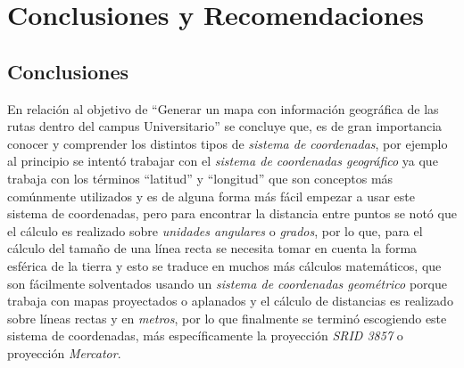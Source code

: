 
\chapter{Conclusiones y Recomendaciones}

\section{Conclusiones}


En relación al objetivo de ``Generar un mapa con información geográfica de las rutas dentro del campus Universitario'' se concluye que, es de gran importancia conocer y comprender los distintos tipos de \emph{sistema de coordenadas}, por ejemplo al principio se intentó trabajar con el \emph{sistema de coordenadas geográfico} ya que trabaja con los términos ``latitud'' y ``longitud'' que son conceptos más comúnmente utilizados y es de alguna forma más fácil empezar a usar este sistema de coordenadas, pero para encontrar la distancia entre puntos se not\'o que el cálculo es realizado sobre \emph{unidades angulares} o \emph{grados}, por lo que, para el cálculo del tamaño de una línea recta se necesita tomar en cuenta la forma esférica de la tierra y esto se traduce en muchos más cálculos matemáticos, que son fácilmente solventados usando un \emph{sistema de coordenadas geométrico} porque trabaja con mapas proyectados o aplanados y el cálculo de distancias es realizado sobre líneas rectas y en \emph{metros}, por lo que finalmente se terminó escogiendo este sistema de coordenadas, más específicamente la proyección \emph{SRID 3857} o proyección \emph{Mercator}. \\




